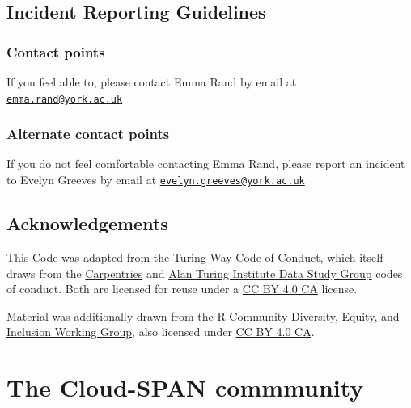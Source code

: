 \documentclass[
]{book}
\begin{document}
\hypertarget{incident-reporting-guidelines}{%
\section{Incident Reporting Guidelines}\label{incident-reporting-guidelines}}

\hypertarget{contact-points}{%
\subsection{Contact points}\label{contact-points}}

If you feel able to, please contact Emma Rand by email at \href{mailto:emma.rand@york.ac.uk}{\nolinkurl{emma.rand@york.ac.uk}}

\hypertarget{alternate-contact-points}{%
\subsection{Alternate contact points}\label{alternate-contact-points}}

If you do not feel comfortable contacting Emma Rand, please report an incident to Evelyn Greeves by email at \href{mailto:evelyn.greeves@york.ac.uk}{\nolinkurl{evelyn.greeves@york.ac.uk}}

\hypertarget{acknowledgements}{%
\section{Acknowledgements}\label{acknowledgements}}

This Code was adapted from the \href{https://the-turing-way.netlify.app/community-handbook/coc.html}{Turing Way} Code of Conduct, which itself draws from the \href{https://docs.carpentries.org/topic_folders/policies/code-of-conduct.html}{Carpentries} and \href{https://docs.google.com/document/d/1iv2cizNPUwtEhHqaezAzjIoKkaIX02f7XbYmFMXDTGY/edit\#heading=h.eawfypsf8ylf}{Alan Turing Institute Data Study Group} codes of conduct. Both are licensed for reuse under a \href{https://creativecommons.org/licenses/by/4.0/}{CC BY 4.0 CA} license.

Material was additionally drawn from the \href{https://github.com/RConsortium/RCDI-WG/blob/0ca0a91dccc9296ff53a5806f52a2a49dbb8850d/conduct/code-of-conductd}{R Community Diversity, Equity, and Inclusion Working Group}, also licensed under \href{https://creativecommons.org/licenses/by/4.0/}{CC BY 4.0 CA}.

\hypertarget{the-cloud-span-commmunity}{%
\chapter{The Cloud-SPAN commmunity}\label{the-cloud-span-commmunity}}
\end{document}
